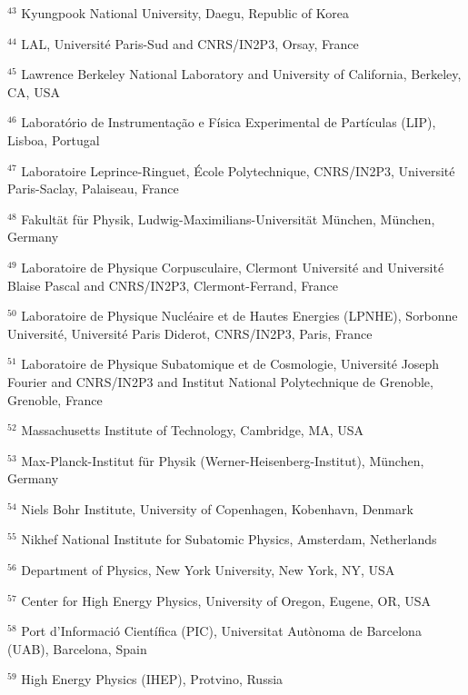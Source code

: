\par {\footnotesize $^{43}$ Kyungpook National University, Daegu, Republic of Korea}
\par {\footnotesize $^{44}$ LAL, Université Paris-Sud and CNRS/IN2P3, Orsay, France}
\par {\footnotesize $^{45}$ Lawrence Berkeley National Laboratory and University of California, Berkeley, CA, USA}
\par {\footnotesize $^{46}$ Laboratório de Instrumentação e Física Experimental de Partículas (LIP), Lisboa, Portugal}
\par {\footnotesize $^{47}$ Laboratoire Leprince-Ringuet, École Polytechnique, CNRS/IN2P3, Université Paris-Saclay, Palaiseau, France}
\par {\footnotesize $^{48}$ Fakultät für Physik, Ludwig-Maximilians-Universität München, München, Germany}
\par {\footnotesize $^{49}$ Laboratoire de Physique Corpusculaire, Clermont Université and Université Blaise Pascal and CNRS/IN2P3, Clermont-Ferrand, France}
\par {\footnotesize $^{50}$ Laboratoire de Physique Nucléaire et de Hautes Energies (LPNHE), Sorbonne Université, Université Paris Diderot, CNRS/IN2P3, Paris, France}
\par {\footnotesize $^{51}$ Laboratoire de Physique Subatomique et de Cosmologie, Université Joseph Fourier and CNRS/IN2P3 and Institut National Polytechnique de Grenoble, Grenoble, France}
\par {\footnotesize $^{52}$ Massachusetts Institute of Technology, Cambridge, MA, USA}
\par {\footnotesize $^{53}$ Max-Planck-Institut für Physik (Werner-Heisenberg-Institut), München, Germany}
\par {\footnotesize $^{54}$ Niels Bohr Institute, University of Copenhagen, Kobenhavn, Denmark}
\par {\footnotesize $^{55}$ Nikhef National Institute for Subatomic Physics, Amsterdam, Netherlands}
\par {\footnotesize $^{56}$ Department of Physics, New York University, New York, NY, USA}
\par {\footnotesize $^{57}$ Center for High Energy Physics, University of Oregon, Eugene, OR, USA}
\par {\footnotesize $^{58}$ Port d’Informació Científica (PIC), Universitat Autònoma de Barcelona (UAB), Barcelona, Spain}
\par {\footnotesize $^{59}$ High Energy Physics (IHEP), Protvino, Russia}
